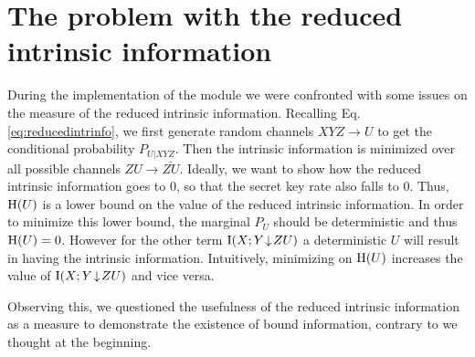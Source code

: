 \section{The problem with the reduced intrinsic information}\label{problem}
    During the implementation of the module we were confronted with some issues on the measure of the reduced intrinsic information.
    Recalling Eq. \ref{eq:reducedintrinfo}, we first generate random channels $XYZ \rightarrow U$ to get the conditional probability $P_{U|XYZ}$. 
    Then the intrinsic information is minimized over all possible channels $ZU \rightarrow \bar{ZU}$.
    Ideally, we want to show how the reduced intrinsic information goes to $0$, so that the secret key rate also falls to $0$. 
    Thus, $\operatorname{H} (U)$ is a lower bound on the value of the reduced intrinsic information.
    In order to minimize this lower bound, the marginal $P_U$ should be deterministic and thus $\operatorname{H}(U) = 0$.
    However for the other term $\operatorname{I}(X;Y\!\downarrow\!ZU)$ a deterministic $U$ will result in having the intrinsic information.
    Intuitively, minimizing on $\operatorname{H}(U)$ increases the value of $\operatorname{I}(X;Y\!\downarrow\!ZU)$ and vice versa.
    
    Observing this, we questioned the usefulness of the reduced intrinsic information as a measure to demonstrate the existence of bound information, contrary to we thought at the beginning.
    
